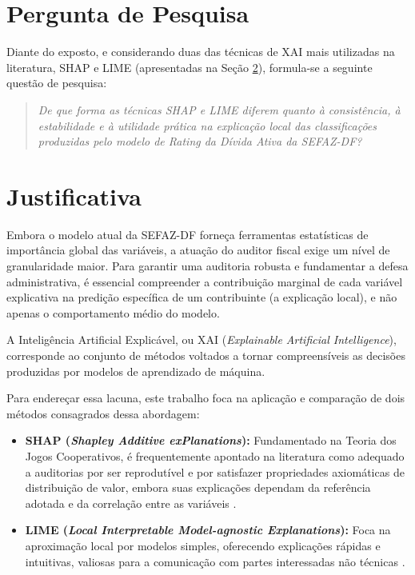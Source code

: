 \section{Pergunta de Pesquisa}
Diante do exposto, e considerando duas das técnicas de XAI mais utilizadas na literatura, SHAP e LIME (apresentadas na Seção \ref{sec:justificativa}), formula-se a seguinte questão de pesquisa:
\begin{quote}
\textit{De que forma as técnicas SHAP e LIME diferem quanto à consistência, à estabilidade e à utilidade prática na explicação local das classificações produzidas pelo modelo de Rating da Dívida Ativa da SEFAZ-DF?}
\end{quote}

\section{Justificativa}
\label{sec:justificativa}

Embora o modelo atual da SEFAZ-DF forneça ferramentas estatísticas de importância global das variáveis, a atuação do auditor fiscal exige um nível de granularidade maior. Para garantir uma auditoria robusta e fundamentar a defesa administrativa, é essencial compreender a contribuição marginal de cada variável explicativa na predição específica de um contribuinte (a explicação local), e não apenas o comportamento médio do modelo.

A Inteligência Artificial Explicável, ou XAI (\textit{Explainable Artificial Intelligence}), corresponde ao conjunto de métodos voltados a tornar compreensíveis as decisões produzidas por modelos de aprendizado de máquina.

Para endereçar essa lacuna, este trabalho foca na aplicação e comparação de dois métodos consagrados dessa abordagem:
\begin{itemize}
\item \textbf{SHAP (\textit{Shapley Additive exPlanations}):} Fundamentado na Teoria dos Jogos Cooperativos, é frequentemente apontado na literatura como adequado a auditorias por ser reprodutível e por satisfazer propriedades axiomáticas de distribuição de valor, embora suas explicações dependam da referência adotada e da correlação entre as variáveis \cite{molnarInterpretableMachineLearning}.
\item \textbf{LIME (\textit{Local Interpretable Model-agnostic Explanations}):} Foca na aproximação local por modelos simples, oferecendo explicações rápidas e intuitivas, valiosas para a comunicação com partes interessadas não técnicas \cite{maratheDemystifyingInterpretableAI}.
\end{itemize}

